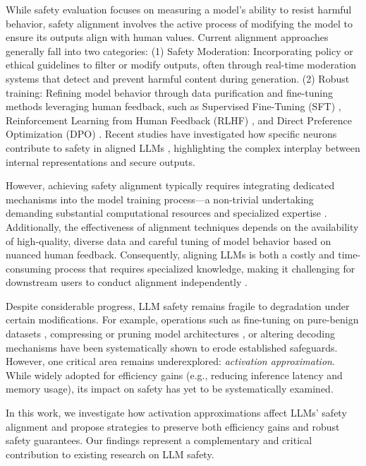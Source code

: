 While safety evaluation focuses on measuring a model’s ability to resist harmful behavior, safety alignment involves the active process of modifying the model to ensure its outputs align with human values. Current alignment approaches generally fall into two categories: (1) Safety Moderation: Incorporating policy or ethical guidelines to filter or modify outputs, often through real-time moderation systems that detect and prevent harmful content during generation. (2) Robust training: Refining model behavior through data purification and fine-tuning methods leveraging human feedback, such as Supervised Fine-Tuning (SFT) \cite{ouyang2022training,zheng2023judging}, Reinforcement Learning from Human Feedback (RLHF) \cite{ouyang2022training}, and Direct Preference Optimization (DPO) \cite{rafailov2024direct}. Recent studies have investigated how specific neurons contribute to safety in aligned LLMs \cite{touvron2023llama,OpenAI2023ChatGPT,hsu2024safe,wei2024assessing,huang2024harmful,huanglisa}, highlighting the complex interplay between internal representations and secure outputs.

However, achieving safety alignment typically requires integrating dedicated mechanisms into the model training process—a non-trivial undertaking demanding substantial computational resources and specialized expertise \cite{ouyang2022training,zou2023universal,yu2023gptfuzzer,wang2024detoxifying}. Additionally, the effectiveness of alignment techniques depends on the availability of high-quality, diverse data and careful tuning of model behavior based on nuanced human feedback. Consequently, aligning LLMs is both a costly and time-consuming process that requires specialized knowledge, making it challenging for downstream users to conduct alignment independently \cite{horwitz2024recovering,yang2024self,lyu2024keeping}.

Despite considerable progress, LLM safety remains fragile to degradation under certain modifications. For example, operations such as fine-tuning on pure-benign datasets \cite{qi2023fine,hsu2024safe,shen2024seal}, compressing or pruning model architectures \cite{jaiswal2023compressing,yin2023outlier,li2024discovering,xu2024beyond,ullah2024navigating}, or altering decoding mechanisms \cite{huang2023catastrophic,huang2024trustllm,mazeika2024harmbench} have been systematically shown to erode established safeguards. However, one critical area remains underexplored: \textit{activation approximation}. While widely adopted for efficiency gains (e.g., reducing inference latency and memory usage), its impact on safety has yet to be systematically examined.

In this work, we investigate how activation approximations affect LLMs' safety alignment and propose strategies to preserve both efficiency gains and robust safety guarantees. Our findings represent a complementary and critical contribution to existing research on LLM safety.


